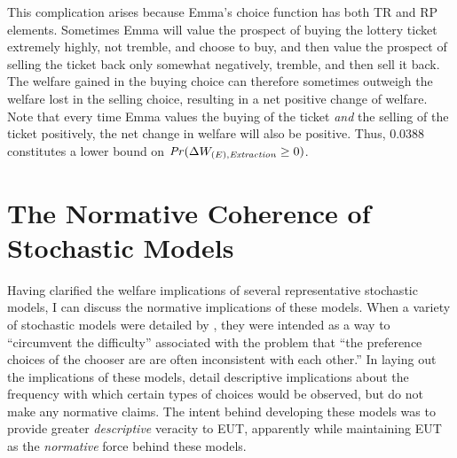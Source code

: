 \documentclass[../main.tex]{subfiles}
\begin{document}
This complication arises because Emma's choice function has both TR and RP elements.
Sometimes Emma will value the prospect of buying the lottery ticket extremely highly, not tremble, and choose to buy, and then value the prospect of selling the ticket back only somewhat negatively, tremble, and then sell it back.
The welfare gained in the buying choice can therefore sometimes outweigh the welfare lost in the selling choice, resulting in a net positive change of welfare.
Note that every time Emma values the buying of the ticket \textit{and} the selling of the ticket positively, the net change in welfare will also be positive.
Thus, $0.0388$ constitutes a lower bound on ${\mathit{Pr}}(\Delta W_{(E),\mathit{Extraction}} \geq 0)$.

\addtocounter{footnote}{-1}

\singlespacing
\section{The Normative Coherence of Stochastic Models}
\doublespacing



Having clarified the welfare implications of several representative stochastic models, I can discuss the normative implications of these models.
When a variety of stochastic models were detailed by \textcite{Becker1963}, they were intended as a way to \enquote{circumvent the difficulty} associated with the problem that \enquote{the preference choices of the chooser are are often inconsistent with each other.}
In laying out the implications of these models, \textcite{Becker1963} detail descriptive implications about the frequency with which certain types of choices would be observed, but do not make any normative claims.
The intent behind developing these models was to provide greater \textit{descriptive} veracity to EUT, apparently while maintaining EUT as the \textit{normative} force behind these models.
\end{document}
